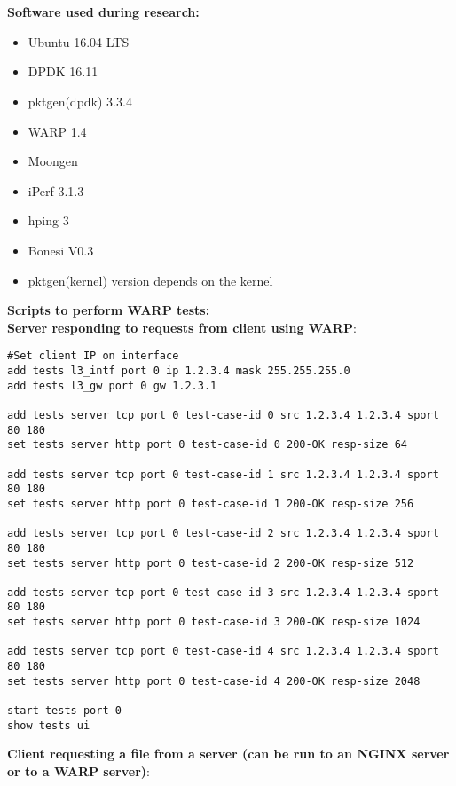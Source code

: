 \thispagestyle{empty}

\chapter{}\label{appendix:software}

\textbf{Software used during research:}
\begin{itemize}
\item{Ubuntu 16.04 LTS}
\item{DPDK 16.11}
\item{pktgen(dpdk) 3.3.4}
\item{WARP 1.4}
\item{Moongen}
\item{iPerf 3.1.3}
\item{hping 3}
\item{Bonesi V0.3}
\item{pktgen(kernel) version depends on the kernel}
\end{itemize}
\textbf{Scripts to perform WARP tests:\\}
\textbf{Server responding to requests from client using WARP}:
\begin{verbatim}
#Set client IP on interface
add tests l3_intf port 0 ip 1.2.3.4 mask 255.255.255.0
add tests l3_gw port 0 gw 1.2.3.1 

add tests server tcp port 0 test-case-id 0 src 1.2.3.4 1.2.3.4 sport 80 180
set tests server http port 0 test-case-id 0 200-OK resp-size 64

add tests server tcp port 0 test-case-id 1 src 1.2.3.4 1.2.3.4 sport 80 180
set tests server http port 0 test-case-id 1 200-OK resp-size 256

add tests server tcp port 0 test-case-id 2 src 1.2.3.4 1.2.3.4 sport 80 180
set tests server http port 0 test-case-id 2 200-OK resp-size 512

add tests server tcp port 0 test-case-id 3 src 1.2.3.4 1.2.3.4 sport 80 180
set tests server http port 0 test-case-id 3 200-OK resp-size 1024

add tests server tcp port 0 test-case-id 4 src 1.2.3.4 1.2.3.4 sport 80 180
set tests server http port 0 test-case-id 4 200-OK resp-size 2048

start tests port 0
show tests ui
\end{verbatim}
\textbf{Client requesting a file from a server (can be run to an NGINX server or to a WARP server)}:
